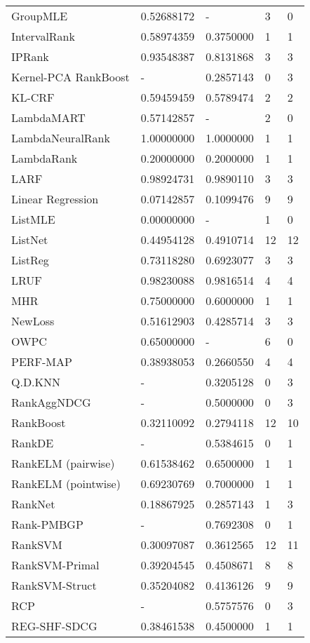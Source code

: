 \begin{longtable}{l|p{2.3cm}|p{2.3cm}|p{2.3cm}|p{2.33cm}}
Group\acs{MLE} & 0.52688172 & - & 3 & 0 \\ 
IntervalRank & 0.58974359 & 0.3750000 & 1 & 1 \\ 
\acs{IP}Rank & 0.93548387 & 0.8131868 & 3 & 3 \\
Kernel-\acs{PCA} RankBoost & - & 0.2857143 & 0 & 3 \\
KL-\acs{CRF} & 0.59459459 & 0.5789474 & 2 & 2 \\ 
LambdaMART & 0.57142857 & - & 2 & 0\\ 
LambdaNeuralRank & 1.00000000 & 1.0000000 & 1 & 1 \\ 
LambdaRank & 0.20000000 & 0.2000000 & 1 & 1\\ 
LARF & 0.98924731 & 0.9890110 & 3 & 3 \\ 
Linear Regression & 0.07142857 & 0.1099476 & 9 & 9 \\ 
List\acs{MLE} & 0.00000000 & - & 1 & 0 \\ 
ListNet & 0.44954128 & 0.4910714 & 12 & 12 \\ 
ListReg & 0.73118280 & 0.6923077 & 3 & 3 \\ 
LRUF & 0.98230088 & 0.9816514 & 4 & 4 \\ 
MHR & 0.75000000 & 0.6000000 & 1 & 1 \\ 
NewLoss & 0.51612903 & 0.4285714 & 3 & 3 \\ 
OWPC & 0.65000000 & - & 6 & 0 \\ 
PERF-\acs{MAP} & 0.38938053 & 0.2660550 & 4 & 4 \\ 
Q.D.KNN & - & 0.3205128 & 0 & 3 \\
RankAgg\acs{NDCG} & - & 0.5000000 & 0 & 3 \\ 
RankBoost & 0.32110092 & 0.2794118 & 12 & 10 \\
RankDE & - & 0.5384615 & 0 & 1 \\
RankELM (pairwise) & 0.61538462 & 0.6500000 & 1 & 1 \\ 
RankELM (pointwise) & 0.69230769 & 0.7000000 & 1 & 1 \\ 
RankNet & 0.18867925 & 0.2857143 & 1 & 3\\
Rank-PMBGP & - & 0.7692308 & 0 & 1 \\ 
Rank\acs{SVM} & 0.30097087 & 0.3612565 & 12 & 11 \\ 
Rank\acs{SVM}-Primal & 0.39204545 & 0.4508671 & 8 & 8 \\ 
Rank\acs{SVM}-Struct & 0.35204082 & 0.4136126 & 9 & 9 \\
RCP & - & 0.5757576 & 0 & 3 \\  
REG-SHF-SDCG & 0.38461538 & 0.4500000 & 1 & 1 \\ 

\end{longtable}
